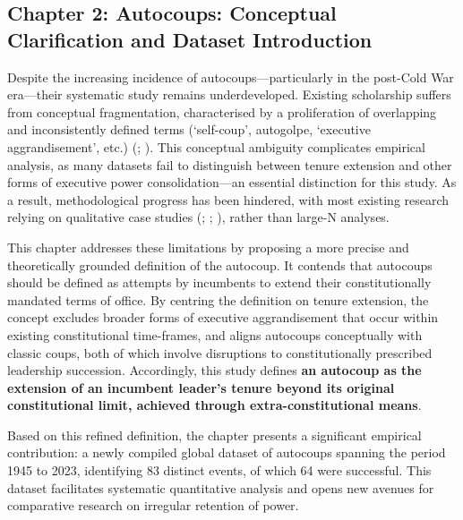 \documentclass[
  12pt,
]{report}
\begin{document}
\subsection*{Chapter 2: Autocoups: Conceptual Clarification and Dataset
Introduction}\label{chapter-2-autocoups-conceptual-clarification-and-dataset-introduction}

Despite the increasing incidence of autocoups---particularly in the
post-Cold War era---their systematic study remains underdeveloped.
Existing scholarship suffers from conceptual fragmentation,
characterised by a proliferation of overlapping and inconsistently
defined terms (`self-coup', autogolpe, `executive aggrandisement', etc.)
(;
). This conceptual
ambiguity complicates empirical analysis, as many datasets fail to
distinguish between tenure extension and other forms of executive power
consolidation---an essential distinction for this study. As a result,
methodological progress has been hindered, with most existing research
relying on qualitative case studies (; ;
),
rather than large-N analyses.

This chapter addresses these limitations by proposing a more precise and
theoretically grounded definition of the autocoup. It contends that
autocoups should be defined as attempts by incumbents to extend their
constitutionally mandated terms of office. By centring the definition on
tenure extension, the concept excludes broader forms of executive
aggrandisement that occur within existing constitutional time-frames,
and aligns autocoups conceptually with classic coups, both of which
involve disruptions to constitutionally prescribed leadership
succession. Accordingly, this study defines \textbf{an autocoup as the
extension of an incumbent leader's tenure beyond its original
constitutional limit, achieved through extra-constitutional means}.

Based on this refined definition, the chapter presents a significant
empirical contribution: a newly compiled global dataset of autocoups
spanning the period 1945 to 2023, identifying 83 distinct events, of
which 64 were successful. This dataset facilitates systematic
quantitative analysis and opens new avenues for comparative research on
irregular retention of power.
\end{document}
